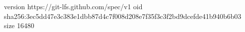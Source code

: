 version https://git-lfs.github.com/spec/v1
oid sha256:3ec5dd47e3c383e1dbb87d4c7f008d208e7f35f3c3f2bd9dcefde41b940b6b03
size 16480
